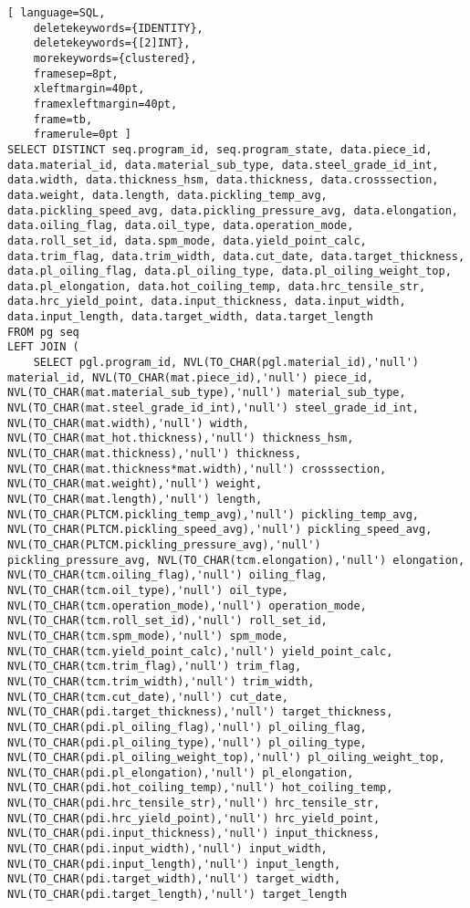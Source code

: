 \documentclass{article}
\begin{document}
	
\thispagestyle{empty}
\begin{lstlisting}[ language=SQL,
	deletekeywords={IDENTITY},
	deletekeywords={[2]INT},
	morekeywords={clustered},
	framesep=8pt,
	xleftmargin=40pt,
	framexleftmargin=40pt,
	frame=tb,
	framerule=0pt ]
SELECT DISTINCT seq.program_id, seq.program_state, data.piece_id, data.material_id, data.material_sub_type, data.steel_grade_id_int, data.width, data.thickness_hsm, data.thickness, data.crosssection, data.weight, data.length, data.pickling_temp_avg, data.pickling_speed_avg, data.pickling_pressure_avg, data.elongation, data.oiling_flag, data.oil_type, data.operation_mode, data.roll_set_id, data.spm_mode, data.yield_point_calc, data.trim_flag, data.trim_width, data.cut_date, data.target_thickness, data.pl_oiling_flag, data.pl_oiling_type, data.pl_oiling_weight_top, data.pl_elongation, data.hot_coiling_temp, data.hrc_tensile_str, data.hrc_yield_point, data.input_thickness, data.input_width, data.input_length, data.target_width, data.target_length
FROM pg seq 
LEFT JOIN (
	SELECT pgl.program_id, NVL(TO_CHAR(pgl.material_id),'null') material_id, NVL(TO_CHAR(mat.piece_id),'null') piece_id, NVL(TO_CHAR(mat.material_sub_type),'null') material_sub_type, NVL(TO_CHAR(mat.steel_grade_id_int),'null') steel_grade_id_int, NVL(TO_CHAR(mat.width),'null') width, NVL(TO_CHAR(mat_hot.thickness),'null') thickness_hsm, NVL(TO_CHAR(mat.thickness),'null') thickness, NVL(TO_CHAR(mat.thickness*mat.width),'null') crosssection, NVL(TO_CHAR(mat.weight),'null') weight, NVL(TO_CHAR(mat.length),'null') length, NVL(TO_CHAR(PLTCM.pickling_temp_avg),'null') pickling_temp_avg, NVL(TO_CHAR(PLTCM.pickling_speed_avg),'null') pickling_speed_avg, NVL(TO_CHAR(PLTCM.pickling_pressure_avg),'null') pickling_pressure_avg, NVL(TO_CHAR(tcm.elongation),'null') elongation, NVL(TO_CHAR(tcm.oiling_flag),'null') oiling_flag, NVL(TO_CHAR(tcm.oil_type),'null') oil_type, NVL(TO_CHAR(tcm.operation_mode),'null') operation_mode, NVL(TO_CHAR(tcm.roll_set_id),'null') roll_set_id, NVL(TO_CHAR(tcm.spm_mode),'null') spm_mode, NVL(TO_CHAR(tcm.yield_point_calc),'null') yield_point_calc, NVL(TO_CHAR(tcm.trim_flag),'null') trim_flag, NVL(TO_CHAR(tcm.trim_width),'null') trim_width, NVL(TO_CHAR(tcm.cut_date),'null') cut_date, NVL(TO_CHAR(pdi.target_thickness),'null') target_thickness, NVL(TO_CHAR(pdi.pl_oiling_flag),'null') pl_oiling_flag, NVL(TO_CHAR(pdi.pl_oiling_type),'null') pl_oiling_type, NVL(TO_CHAR(pdi.pl_oiling_weight_top),'null') pl_oiling_weight_top, NVL(TO_CHAR(pdi.pl_elongation),'null') pl_elongation, NVL(TO_CHAR(pdi.hot_coiling_temp),'null') hot_coiling_temp, NVL(TO_CHAR(pdi.hrc_tensile_str),'null') hrc_tensile_str, NVL(TO_CHAR(pdi.hrc_yield_point),'null') hrc_yield_point, NVL(TO_CHAR(pdi.input_thickness),'null') input_thickness, NVL(TO_CHAR(pdi.input_width),'null') input_width, NVL(TO_CHAR(pdi.input_length),'null') input_length, NVL(TO_CHAR(pdi.target_width),'null') target_width, NVL(TO_CHAR(pdi.target_length),'null') target_length 

\end{lstlisting}
\end{document}
